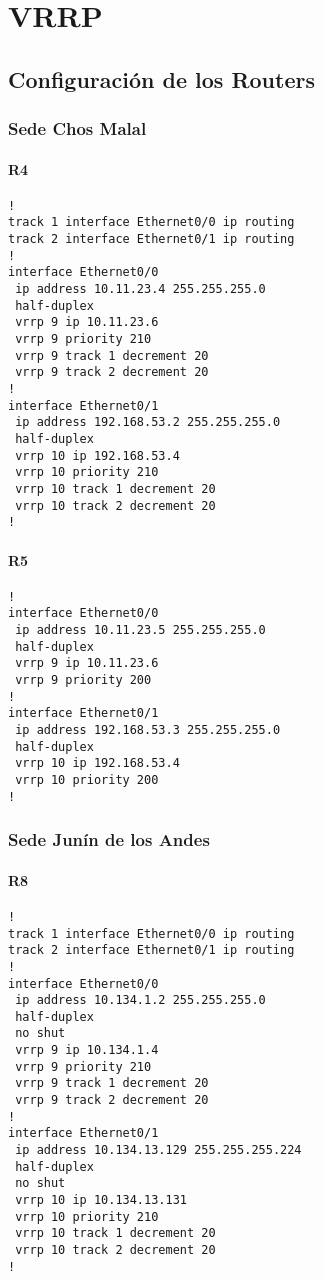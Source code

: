\section{VRRP}
\subsection{Configuración de los Routers}

\subsubsection{Sede Chos Malal}
\paragraph{R4}
{\small
\begin{verbatim}
!
track 1 interface Ethernet0/0 ip routing
track 2 interface Ethernet0/1 ip routing
!
interface Ethernet0/0
 ip address 10.11.23.4 255.255.255.0
 half-duplex
 vrrp 9 ip 10.11.23.6
 vrrp 9 priority 210
 vrrp 9 track 1 decrement 20
 vrrp 9 track 2 decrement 20
!
interface Ethernet0/1
 ip address 192.168.53.2 255.255.255.0
 half-duplex
 vrrp 10 ip 192.168.53.4
 vrrp 10 priority 210
 vrrp 10 track 1 decrement 20
 vrrp 10 track 2 decrement 20
!
\end{verbatim}

\paragraph{R5}
{\small
\begin{verbatim}
!
interface Ethernet0/0
 ip address 10.11.23.5 255.255.255.0
 half-duplex
 vrrp 9 ip 10.11.23.6
 vrrp 9 priority 200
!
interface Ethernet0/1
 ip address 192.168.53.3 255.255.255.0
 half-duplex
 vrrp 10 ip 192.168.53.4
 vrrp 10 priority 200
!
\end{verbatim}
}

\subsubsection{Sede Junín de los Andes}
\paragraph{R8}
{\small
\begin{verbatim}
!
track 1 interface Ethernet0/0 ip routing
track 2 interface Ethernet0/1 ip routing
!
interface Ethernet0/0
 ip address 10.134.1.2 255.255.255.0
 half-duplex
 no shut
 vrrp 9 ip 10.134.1.4
 vrrp 9 priority 210
 vrrp 9 track 1 decrement 20
 vrrp 9 track 2 decrement 20
!
interface Ethernet0/1
 ip address 10.134.13.129 255.255.255.224
 half-duplex
 no shut
 vrrp 10 ip 10.134.13.131
 vrrp 10 priority 210
 vrrp 10 track 1 decrement 20
 vrrp 10 track 2 decrement 20
!
\end{verbatim}
}

}
